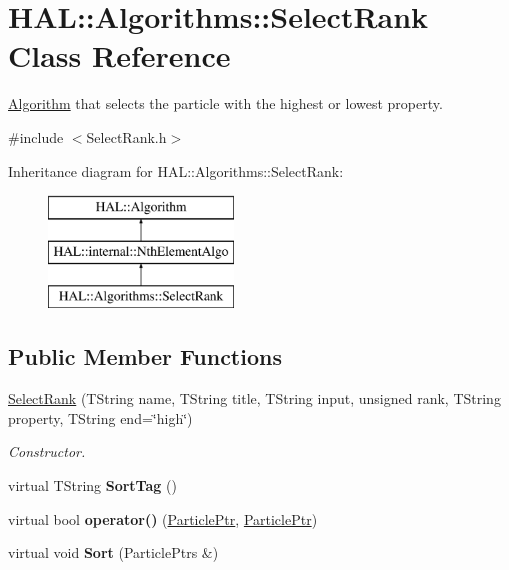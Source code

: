 \hypertarget{class_h_a_l_1_1_algorithms_1_1_select_rank}{\section{H\+A\+L\+:\+:Algorithms\+:\+:Select\+Rank Class Reference}
\label{class_h_a_l_1_1_algorithms_1_1_select_rank}
}


\hyperlink{class_h_a_l_1_1_algorithm}{Algorithm} that selects the particle with the highest or lowest property.  




{\ttfamily \#include $<$Select\+Rank.\+h$>$}

Inheritance diagram for H\+A\+L\+:\+:Algorithms\+:\+:Select\+Rank\+:\begin{figure}[H]
\begin{center}
\leavevmode
\includegraphics[height=3.000000cm]{class_h_a_l_1_1_algorithms_1_1_select_rank}
\end{center}
\end{figure}
\subsection*{Public Member Functions}
\begin{DoxyCompactItemize}
\item 
\hyperlink{class_h_a_l_1_1_algorithms_1_1_select_rank_ae6eddc7a9fae09a00244d8288c7fce7a}{Select\+Rank} (T\+String name, T\+String title, T\+String input, unsigned rank, T\+String property, T\+String end=\char`\"{}high\char`\"{})
\begin{DoxyCompactList}\small\item\em Constructor. \end{DoxyCompactList}\item 
\hypertarget{class_h_a_l_1_1_algorithms_1_1_select_rank_a1732a3c1a816ad7feb53f75cd2976758}{virtual T\+String {\bfseries Sort\+Tag} ()}\label{class_h_a_l_1_1_algorithms_1_1_select_rank_a1732a3c1a816ad7feb53f75cd2976758}

\item 
\hypertarget{class_h_a_l_1_1_algorithms_1_1_select_rank_af18e817fd87a314c515807e134bf4634}{virtual bool {\bfseries operator()} (\hyperlink{class_h_a_l_1_1_generic_particle}{Particle\+Ptr}, \hyperlink{class_h_a_l_1_1_generic_particle}{Particle\+Ptr})}\label{class_h_a_l_1_1_algorithms_1_1_select_rank_af18e817fd87a314c515807e134bf4634}

\item 
\hypertarget{class_h_a_l_1_1_algorithms_1_1_select_rank_a150a17708ac6e1cf64752e445718afb0}{virtual void {\bfseries Sort} (Particle\+Ptrs \&)}\label{class_h_a_l_1_1_algorithms_1_1_select_rank_a150a17708ac6e1cf64752e445718afb0}

\end{DoxyCompactItemize}
